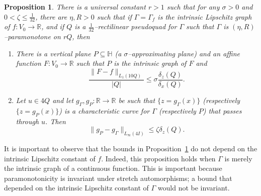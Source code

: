 \documentclass[11pt,reqno]{amsart}
\renewcommand{\H}{\mathbb{H}}
\newcommand{\R}{\mathbb{R}}
\newcommand{\0}{\mathbf{0}}
\renewcommand{\1}{\mathbf 1}
\newcommand{\from}{\colon}
\renewcommand{\subset}{\subseteq}
\renewcommand{\le}{\leqslant}
\newtheorem{prop}[thm]{Proposition}
\theoremstyle{remark}
\begin{document}
\begin{prop}\label{prop:Omega control}
  There is a universal constant $r>1$ such that for any $\sigma>0$ and $0<\zeta\le \frac{1}{32}$, there are $\eta, R > 0$ such that if $\Gamma=\Gamma_f$ is the intrinsic Lipschitz graph of $f\from V_0\to \R$, and if $Q$ is a $\frac{1}{32}$--rectilinear pseudoquad for $\Gamma$ such that $\Gamma$ is $(\eta, R)$--paramonotone on $rQ$, then
  \begin{enumerate}
  \item \label{it:omega control plane}
    There is a vertical plane $P\subset \H$ (a $\sigma$--approximating plane) and an affine function $F\from V_0\to \R$ such that $P$ is the intrinsic graph of $F$ and
    \begin{equation}
      \frac{\|F-f\|_{L_1(10 Q)}}{|Q|} \le \sigma \frac{\delta_z(Q)}{\delta_x(Q)}.
    \end{equation}
  \item \label{it:omega control characteristics}
    Let $u\in 4 Q$ and let $g_\Gamma, g_P\from \R\to \R$ be  such that $\{z=g_\Gamma(x)\}$ (respectively $\{z=g_P(x)\}$) is a characteristic curve for $\Gamma$ (respectively $P$) that passes through $u$.  Then $$\|g_P-g_\Gamma\|_{L_\infty(4 I)}\le \zeta \delta_z(Q).$$

  \end{enumerate}
\end{prop}

It is important to observe that the bounds in Proposition~\ref{prop:Omega control} do not depend on the intrinsic Lipschitz constant of $f$.  Indeed, this proposition holds when $\Gamma$ is merely the intrinsic graph of a continuous function. %
This is important because paramonotonicity is invariant under stretch automorphisms; a bound that depended on the intrinsic Lipschitz constant of $\Gamma$ would not be invariant.
\end{document}
